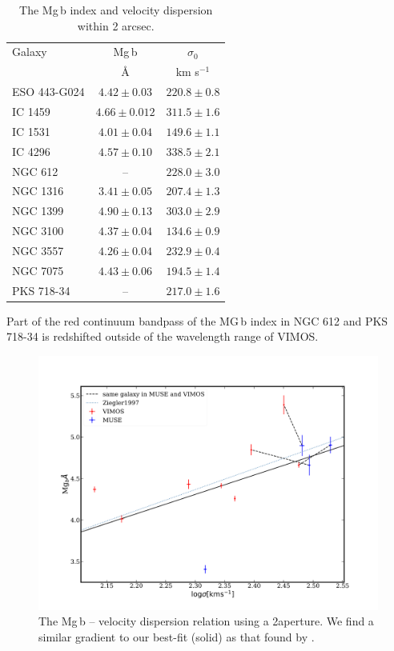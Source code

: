 			\begin{table}
				\centering
			\begin{threeparttable}
				\caption{The Mg\,b index and velocity dispersion within 2 arcsec.}
				\label{tab:globalMg}
				\begin{tabular}{l c c}
					\hline
					\hline
					Galaxy 	& Mg\,b & $\sigma_0$ \\
							& \AA	& km s$^{-1}$ \\
					\hline
					ESO 443-G024 & $4.42 \pm 0.03$ & $220.8 \pm 0.8$ \\
					IC 1459 	& $4.66 \pm 0.012$ & $311.5 \pm 1.6$ \\
					IC 1531 	& $4.01 \pm 0.04$ & $149.6 \pm 1.1$ \\
					IC 4296		& $4.57 \pm 0.10$ & $338.5 \pm 2.1$ \\
					NGC 612 	& --   			  & $228.0 \pm 3.0$ \\
					NGC 1316 	& $3.41 \pm 0.05$ & $207.4 \pm 1.3$ \\
					NGC 1399 	& $4.90 \pm 0.13$ & $303.0 \pm 2.9$ \\
					NGC 3100 	& $4.37 \pm 0.04$ & $134.6 \pm 0.9$ \\
					NGC 3557 	& $4.26 \pm 0.04$ & $232.9 \pm 0.4$ \\
					NGC 7075 	& $4.43 \pm 0.06$ & $194.5 \pm 1.4$ \\
					PKS 718-34  & -- 		      & $217.0 \pm 1.6$ \\
					\hline
					\hline
				\end{tabular}
				\begin{tablenotes}
				\footnotesize
				\note Part of the red continuum bandpass of the MG\,b index in NGC 612 and PKS 718-34 is redshifted outside of the wavelength range of VIMOS.
				\end{tablenotes}
			\end{threeparttable}
			\end{table}


			\begin{figure}
				\centering
				\includegraphics[width=.8\textwidth]{chapter4/Mg_sigma.png}
				\caption[Global Mg\,b--$\sigma$]{The Mg\,b -- velocity dispersion relation using a 2\arcsec aperture. We find a similar gradient to our best-fit (solid) as that found by \citet[; dotted line]{Ziegler1997}.}
				\label{fig:globalMg}
			\end{figure}

